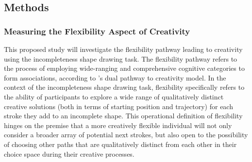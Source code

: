 \documentclass[../Proposal.tex]{subfiles}
\begin{document}

\subsection*{Methods}

\subsubsection*{Measuring the Flexibility Aspect of Creativity}
This proposed study will investigate the flexibility pathway leading to creativity using the incompleteness shape drawing task. The flexibility pathway refers to the process of employing wide-ranging and comprehensive cognitive categories to form associations, according to \textcite{nijstad_dual_2010}'s dual pathway to creativity model. In the context of the incompleteness shape drawing task, flexibility specifically refers to the ability of participants to explore a wide range of qualitatively distinct creative solutions (both in terms of starting position and trajectory) for each stroke they add to an incomplete shape. This operational definition of flexibility hinges on the premise that a more creatively flexible individual will not only consider a broader array of potential next strokes, but also open to the possibility of choosing other paths that are qualitatively distinct from each other in their choice space during their creative processes.
\end{document}
